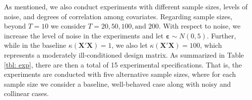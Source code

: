 \documentclass{elsarticle}
\begin{document}
\footnotesize
{}
\normalsize

As mentioned, we also conduct experiments with different sample sizes, 
levels of noise, and degrees of correlation among covariates.
Regarding sample sizes, beyond $T=10$ we consider $T=20, 50, 100, 
\text{and } 200$. 
With respect to noise, we increase the level of noise in the experiments and 
let $\mathbf{\varepsilon}\sim N(0,5)$.
Further, while in the baseline $\kappa(\mathbf{X}'\mathbf{X})=1$, we
also let $\kappa(\mathbf{X}'\mathbf{X})=100$, which represents a 
moderately ill-conditioned design matrix.
As summarized in Table \ref{tbl: exp}, there are then a total of 15 
experimental specifications. 
That is, the experiments are conducted with five alternative sample sizes, 
where for each sample size we consider a baseline, well-behaved case along
with noisy and collinear cases.

\footnotesize
{}
\normalsize
\end{document}
